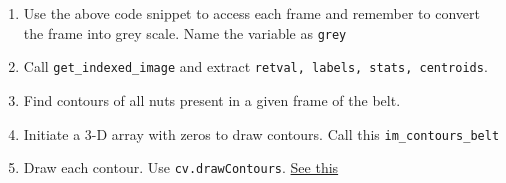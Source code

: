 \documentclass[a4paper,11pt]{article}%
\begin{document}
\begin{enumerate}
\def\labelenumi{\arabic{enumi}.}
\tightlist
\item
  Use the above code snippet to access each frame and remember to
  convert the frame into grey scale. Name the variable as \texttt{grey}
\item
  Call \texttt{get\_indexed\_image} and extract
  \texttt{retval,\ labels,\ stats,\ centroids}.
\item
  Find contours of all nuts present in a given frame of the belt.
\item
  Initiate a 3-D array with zeros to draw contours. Call this
  \texttt{im\_contours\_belt}
\item
  Draw each contour. Use \texttt{cv.drawContours}.
  \href{https://docs.opencv.org/master/d4/d73/tutorial_py_contours_begin.html}{See
  this}
\end{enumerate}
\pagebreak
\end{document}

